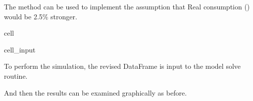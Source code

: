 \documentclass[letterpaper,10pt,english]{jupyterBook}
\begin{document}
\sphinxAtStartPar
The  method can be used to implement the assumption that Real consumption () would be 2.5\% stronger.

\begin{sphinxuseclass}{cell}\begin{sphinxVerbatimInput}

\begin{sphinxuseclass}{cell_input}
\begin{sphinxVerbatim}[commandchars=\\\{\}]
\end{sphinxVerbatim}

\end{sphinxuseclass}\end{sphinxVerbatimInput}

\end{sphinxuseclass}
\sphinxAtStartPar
To perform the simulation, the revised  DataFrame is input to the  model solve routine.

\sphinxAtStartPar
{}

\sphinxAtStartPar
And then the results can be examined graphically as before.
\end{document}
